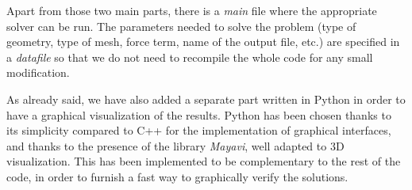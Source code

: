 Apart from those two main parts, there is a \textit{main} file where the appropriate solver can be run. The parameters needed to solve the problem (type of geometry, type of mesh, force term, name of the output file, etc.) are specified in a \textit{datafile} so that we do not need to recompile the whole code for any small modification. 

As already said, we have also added a separate part written in Python in order to have a graphical visualization of the results. Python has been chosen thanks to its simplicity compared to C++ for the implementation of graphical interfaces, and thanks to the presence of the library \textit{Mayavi}, well adapted to $3$D visualization. This has been implemented to be complementary to the rest of the code, in order to furnish a fast way to graphically verify  the solutions. 


